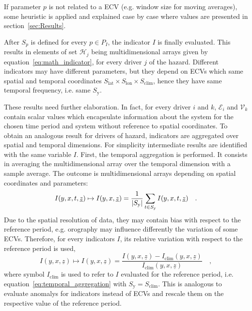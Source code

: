 If parameter $p$ is not related to a \gls{ECV} (e.g. window size for moving averages), some heuristic is applied and explained case by case where values are presented in section~\ref{sec:Results}.

After $S_p$ is defined for every $p \in P_I$, the \gls{indicator} $I$ is finally evaluated. This results in elements of set $\mathcal{H}_j$ being multidimensional arrays given by equation~\eqref{eq:math_indicator}, for every \gls{driver} $j$ of the \gls{hazard}. Different \glspl{indicator} may have different parameters, but they depend on \glspl{ECV} which same spatial and temporal coordinates $S_\text{lat} \times S_\text{lon} \times S_\text{clim}$, hence they have same temporal frequency, i.e. same $S_\text{y}$.

These results need further elaboration. In fact, for every \gls{driver} $i$ and $k$, $\mathcal{E}_i$ and $\mathcal{V}_k$ contain scalar values which encapsulate information about the system for the chosen time period and system without reference to spatial coordinates. To obtain an analogous result for \glspl{driver} of \gls{hazard}, \glspl{indicator} are aggregated over spatial and temporal dimensions. For simplicity intermediate results are identified with the same variable $I$.
First, the temporal aggregation is performed. It consists in averaging the multidimensional array over the temporal dimension with a sample average. The outcome is multidimensional arrays depending on spatial coordinates and parameters:
\begin{equation}
  \label{eq:temporal_aggregation}
  I(y, x, t, \underline{z}) \mapsto I(y, x, \underline{z}) = \frac{1}{\lvert S_\text{y}\rvert} \sum_{t \in S_\text{y}} I(y, x, t, \underline{z})
  \quad .
\end{equation}
Due to the spatial resolution of data, they may contain bias with respect to the reference period, e.g. orography may influence differently the variation of some \glspl{ECV}. Therefore, for every \glspl{indicator} $I$, its relative variation with respect to the reference period is used,
\begin{equation}
  \label{eq:spatial_bias}
  I(y, x, \underline{z}) \mapsto I(y, x, \underline{z}) = \frac{I(y, x, \underline{z}) - I_\text{clim}(y, x, \underline{z})}{I_\text{clim}(y, x, \underline{z})}
  \quad ,
\end{equation}
where symbol $I_\text{clim}$ is used to refer to $I$ evaluated for the reference period, i.e. equation~\eqref{eq:temporal_aggregation} with $S_\text{y} = S_\text{clim}$. This is analogous to evaluate \glspl{anomaly} for \glspl{indicator} instead of \glspl{ECV} and rescale them on the respective value of the reference period.
